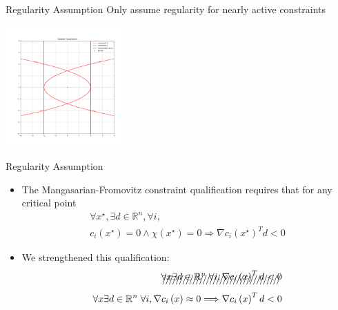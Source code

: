\documentclass{beamer}
\newcommand{\Rn}{\mathbb R ^ {n}}
\begin{document}
\begin{frame}{Regularity Assumption}
	Only assume regularity for nearly active constraints
	\begin{center}
		\includegraphics[width=175px]{images/local_regularity.png}
	\end{center}
\end{frame}

\begin{frame}{Regularity Assumption}
\begin{itemize}
\item The Mangasarian-Fromovitz constraint qualification requires that for any critical point 
\begin{align*}
\forall x^{\star}, \exists d \in \Rn, \forall i, \\
c_i\left(x^{\star}\right)=0 \wedge \chi\left(x^{\star}\right) = 0 \Longrightarrow \nabla c_i\left(x^{\star}\right)^T d < 0 
\end{align*}
\item We strengthened this qualification:
\begin{align*}
\xout{\forall x \exists d \in \Rn\; \forall i, \nabla c_i\left(x\right)^T d < 0} \\
\forall x \exists d \in \Rn\; \forall i, \nabla c_i\left(x\right) \approx 0 \Longrightarrow \nabla c_i\left(x\right)^T d < 0 \\
\end{align*}
\end{itemize}
\end{frame}
\end{document}
